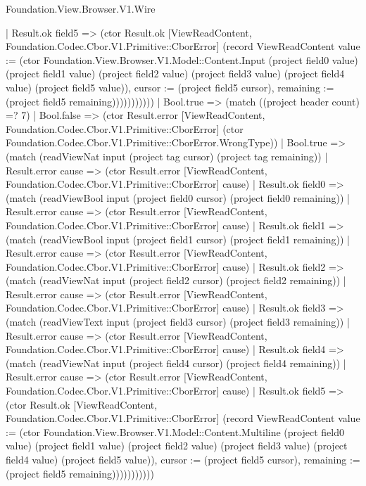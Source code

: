 \begin{lexlean}{Foundation.View.Browser.V1.Wire}
\begin{semanticmodule}
{                                    | Result.ok field5 => (ctor Result.ok [ViewReadContent, Foundation.Codec.Cbor.V1.Primitive::CborError] (record ViewReadContent {value := (ctor Foundation.View.Browser.V1.Model::Content.Input (project field0 value) (project field1 value) (project field2 value) (project field3 value) (project field4 value) (project field5 value)), cursor := (project field5 cursor), remaining := (project field5 remaining)}))))))))))
                    | Bool.true => (match ((project header count) =? 7)
                      | Bool.false => (ctor Result.error [ViewReadContent, Foundation.Codec.Cbor.V1.Primitive::CborError] (ctor Foundation.Codec.Cbor.V1.Primitive::CborError.WrongType))
                      | Bool.true => (match (readViewNat input (project tag cursor) (project tag remaining))
                        | Result.error cause => (ctor Result.error [ViewReadContent, Foundation.Codec.Cbor.V1.Primitive::CborError] cause)
                        | Result.ok field0 => (match (readViewBool input (project field0 cursor) (project field0 remaining))
                          | Result.error cause => (ctor Result.error [ViewReadContent, Foundation.Codec.Cbor.V1.Primitive::CborError] cause)
                          | Result.ok field1 => (match (readViewBool input (project field1 cursor) (project field1 remaining))
                            | Result.error cause => (ctor Result.error [ViewReadContent, Foundation.Codec.Cbor.V1.Primitive::CborError] cause)
                            | Result.ok field2 => (match (readViewNat input (project field2 cursor) (project field2 remaining))
                              | Result.error cause => (ctor Result.error [ViewReadContent, Foundation.Codec.Cbor.V1.Primitive::CborError] cause)
                              | Result.ok field3 => (match (readViewText input (project field3 cursor) (project field3 remaining))
                                | Result.error cause => (ctor Result.error [ViewReadContent, Foundation.Codec.Cbor.V1.Primitive::CborError] cause)
                                | Result.ok field4 => (match (readViewNat input (project field4 cursor) (project field4 remaining))
                                  | Result.error cause => (ctor Result.error [ViewReadContent, Foundation.Codec.Cbor.V1.Primitive::CborError] cause)
                                  | Result.ok field5 => (ctor Result.ok [ViewReadContent, Foundation.Codec.Cbor.V1.Primitive::CborError] (record ViewReadContent {value := (ctor Foundation.View.Browser.V1.Model::Content.Multiline (project field0 value) (project field1 value) (project field2 value) (project field3 value) (project field4 value) (project field5 value)), cursor := (project field5 cursor), remaining := (project field5 remaining)}))))))))))
}
\end{semanticmodule}
\end{lexlean}
